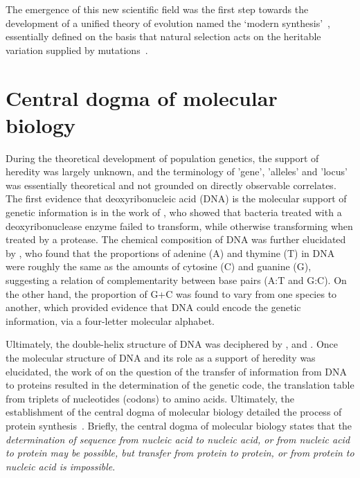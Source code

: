 The emergence of this new scientific field was the first step towards the development of a unified theory of evolution named the ‘modern synthesis’~\citep{huxley1942evolution}, essentially defined on the basis that natural selection acts on the heritable variation supplied by mutations~\citep{mayr1959where,stebbins1966processes,dobzhansky1974chance}.


\section{Central dogma of molecular biology}

During the theoretical development of population genetics, the support of heredity was largely unknown, and the terminology of 'gene', '\glspl{allele}' and 'locus' was essentially theoretical and not grounded on directly observable correlates.
The first evidence that deoxyribonucleic acid (\acrshort{DNA}) is the molecular support of genetic information is in the work of \citet{Avery1944}, who showed that bacteria treated with a deoxyribonuclease enzyme failed to transform, while otherwise transforming when treated by a protease.
The chemical composition of \acrshort{DNA} was further elucidated by \citet{Chargaff1950}, who found that the proportions of adenine (A) and thymine (T) in \acrshort{DNA} were roughly the same as the amounts of cytosine (C) and guanine (G), suggesting a relation of complementarity between base pairs (A:T and G:C).
On the other hand, the proportion of G+C was found to vary from one species to another, which provided evidence that \acrshort{DNA} could encode the genetic information, via a four-letter molecular alphabet.

Ultimately, the double-helix structure of \acrshort{DNA} was deciphered by \citet{franklin1953molecular}, \citet{watson1953molecular} and \citet{wilkins1953molecular}.
Once the molecular structure of DNA and its role as a support of heredity was elucidated, the work of \citet{Crick1958} on the question of the transfer of information from DNA to proteins resulted in the determination of the genetic code, the translation table from triplets of nucleotides (codons) to amino acids.
Ultimately, the establishment of the central dogma of molecular biology detailed the process of protein synthesis~\citep{Crick1970}.
Briefly, the central dogma of molecular biology states that the \textit{determination of sequence from nucleic acid to nucleic acid, or from nucleic acid to protein may be possible, but transfer from protein to protein, or from protein to nucleic acid is impossible}.

